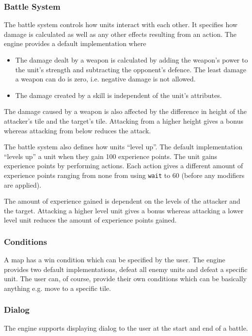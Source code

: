 \subsubsection{Battle System}
\label{ssub:battle_system}

The battle system controls how units interact with each other.  It specifies how damage is calculated as well as any other effects resulting from an action. The engine provides a default implementation where 
\begin{itemize}
	\item The damage dealt by a weapon is calculated by adding the weapon's power to the unit's strength and subtracting the opponent's defence. The least damage a weapon can do is zero, i.e. negative damage is not allowed.
	\item The damage created by a skill is independent of the unit's attributes.
\end{itemize}

The damage caused by a weapon is also affected by the difference in height of the attacker's tile and the target's tile. Attacking from a higher height gives a bonus whereas attacking from below reduces the attack.


The battle system also defines how units ``level up''. The default implementation ``levels up'' a unit when they gain 100 experience points. The unit gains experience points by performing actions. Each action gives a different amount of experience points ranging from none from using \texttt{wait} to 60 (before any modifiers are applied).

The amount of experience gained is dependent on the levels of the attacker and the target. Attacking a higher level unit gives a bonus whereas attacking a lower level unit reduces the amount of experience points gained.

\subsubsection{Conditions}
\label{ssub:events}

A map has a win condition which can be specified by the user.  The engine provides two default implementations, defeat all enemy units and defeat a specific unit.  The user can, of course, provide their own conditions which can be basically anything e.g. move to a specific tile. 


\subsubsection{Dialog}
\label{ssub:dialog}
The engine supports displaying dialog to the user at the start and end of a battle. 

